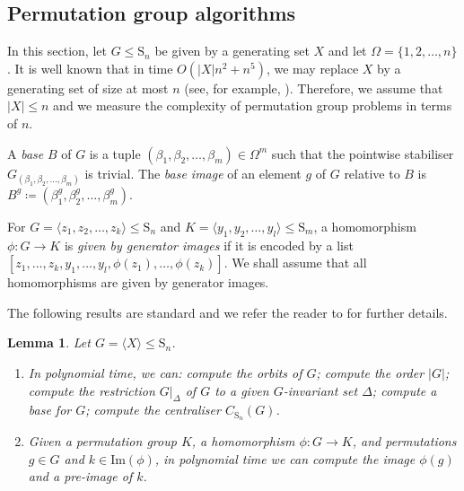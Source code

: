 \documentclass[11pt,a4paper]{article}
\newtheorem{lemma}[theorem]{Lemma}
\theoremstyle{definition}
\theoremstyle{remark}
\newcommand{\Sy}{\mathrm{S}}
\begin{document}

\subsection{Permutation group algorithms}
\label{subsection: backtrack}


In this section, let $G \leq \Sy_n$ be given by a generating set $X$ and let $\Omega = \{ 1,2,\ldots, n\}$. It is well known that in time $O(|X|n^2 + n^5)$, we may replace $X$ by a generating set of size at most $n$ (see, for example, \cite{seress}).
Therefore, we assume that $|X| \leq n$ and we measure the complexity of permutation group problems in terms of $n$. 

A \emph{base} $B$ of $G$ is a tuple $(\beta_1 , \beta_2 , \ldots, \beta_m) \in \Omega^m$ such that the pointwise stabiliser $G_{(\beta_1 , \beta_2 , \ldots ,\beta_m)}$ is trivial. 
The \emph{base image} of an element $g$ of $G$ relative to $B$ is $B^g  \coloneqq  ( \beta_1^g , \beta_2^g , \ldots ,\beta_m^g )$.  


For $G = \langle z_1, z_2, \ldots, z_k \rangle \leq \Sy_n$ and $K = \langle y_1, y_2, \ldots, y_l \rangle \leq \Sy_m$, a homomorphism $\phi:G\rightarrow K$ is \emph{given by generator images} if it is encoded by a list $[z_1, \ldots, z_k, y_1, \ldots, y_l, \phi(z_1), \ldots, \phi(z_k)]$.
We shall assume that all homomorphisms are given by generator images. 

The following results are standard and we refer the reader to \cite{handbookCGT, seress} for further details. 

\begin{lemma} \label{elem polytime}
Let $G = \langle X \rangle \leq \Sy_n$. 
\begin{enumerate}
    \item \label{cent in sym}  In polynomial time, we can: compute the orbits of $G$; compute the order $|G|$; compute the restriction $G|_{\Delta}$ of $G$ to a given $G$-invariant set $\Delta$; compute a base for $G$; compute the centraliser $C_{\Sy_n}(G)$.
    \item \label{im of homom and preim of isom} Given a permutation group $K$, a homomorphism $\phi: G \rightarrow K$, and permutations $g \in G$ and $k \in \mathrm{Im}(\phi)$, in polynomial time we can compute the image $\phi(g)$ and a pre-image of $k$. 
\end{enumerate}
\end{lemma} 
\end{document}
